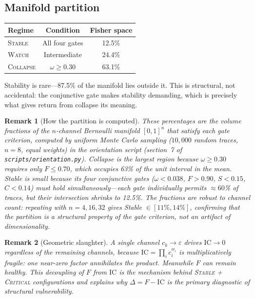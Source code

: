 \documentclass[
  aps,
  prd,
  twocolumn,
  superscriptaddress,
  nofootinbib,
  floatfix
]{revtex4-2}
\newtheorem{remark}{Remark}
\newcommand{\eps}{\varepsilon}
\newcommand{\regime}[1]{\textrm{\upshape\scshape#1}}
\newcommand{\IC}{\mathrm{IC}}
\begin{document}
\subsection{Manifold partition}

\begin{center}
\begin{tabular}{@{}lcc@{}}
\toprule
Regime & Condition & Fisher space \\
\midrule
\regime{Stable} & All four gates & 12.5\% \\
\regime{Watch} & Intermediate & 24.4\% \\
\regime{Collapse} & $\omega \geq 0.30$ & 63.1\% \\
\bottomrule
\end{tabular}
\end{center}

Stability is rare---87.5\% of the manifold lies outside it.  This
is structural, not accidental: the conjunctive gate makes stability
demanding, which is precisely what gives return from collapse its
meaning.

\begin{remark}[How the partition is computed]
These percentages are the volume fractions of the $n$-channel
Bernoulli manifold $[0,1]^n$ that satisfy each gate criterion,
computed by uniform Monte Carlo sampling ($10{,}000$ random
traces, $n = 8$, equal weights) in the orientation script
(section~7 of \texttt{scripts/orientation.py}).
Collapse is the largest region because $\omega \geq 0.30$ requires
only $F \leq 0.70$, which occupies 63\% of the unit interval in
the mean.  Stable is small because its four conjunctive gates
($\omega < 0.038$, $F > 0.90$, $S < 0.15$, $C < 0.14$) must
hold \emph{simultaneously}---each gate individually permits
$\approx 60$\% of traces, but their intersection shrinks to
12.5\%.  The fractions are robust to channel count: repeating
with $n = 4, 16, 32$ gives Stable $\in [11\%, 14\%]$, confirming
that the partition is a structural property of the gate criterion,
not an artifact of dimensionality.
\end{remark}

\begin{remark}[Geometric slaughter]
A single channel $c_k \to \eps$ drives $\IC \to 0$ regardless of
the remaining channels, because $\IC = \prod_i c_i^{w_i}$ is
multiplicatively fragile: one near-zero factor annihilates the
product.  Meanwhile $F$ can remain healthy.  This decoupling of $F$
from $\IC$ is the mechanism behind \regime{Stable} +
\regime{Critical} configurations and explains why $\Delta = F - \IC$
is the primary diagnostic of structural vulnerability.
\end{remark}
\end{document}
